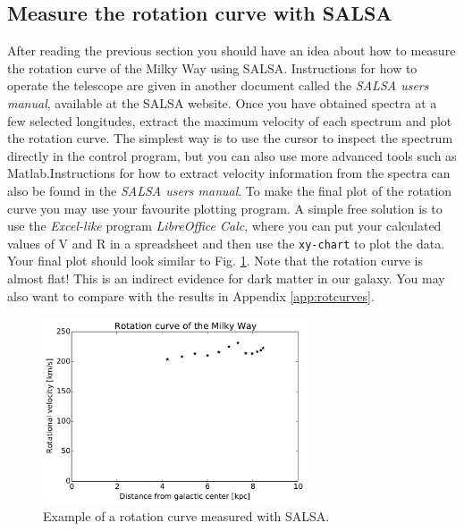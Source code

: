 \subsection{Measure the rotation curve with SALSA}
\label{sect:SALSArot}
After reading the previous section you should have an idea about how to measure
the rotation curve of the Milky Way using SALSA. Instructions for how to
operate the telescope are given in another document called the \emph{SALSA
users manual}, available at the SALSA website.
Once you have obtained spectra
at a few selected longitudes, extract the maximum velocity of each spectrum and
plot the rotation curve.   
The simplest way is to use the cursor to inspect the spectrum directly in the
control program, but you can also use more advanced tools such as
Matlab.Instructions for how to extract velocity information from the spectra
can also be found in the \emph{SALSA users manual}.
To make the final plot of the rotation curve you may use your favourite
plotting program.  A simple free solution is to use the \emph{Excel-like}
program \emph{LibreOffice Calc}, where you can put your calculated
values of V and R in a spreadsheet and then use the {\tt xy-chart} 
to plot the data. Your final plot should look similar to Fig. \ref{fig:rotfinal}.
Note that the rotation curve is almost flat! This is an indirect evidence
for dark matter in our galaxy. You may also want to compare with the results in 
Appendix \ref{app:rotcurves}.

\begin{figure}[t]
\begin{center}
\includegraphics[width=0.7\textwidth]{../figures/SALSA_rotcurve.pdf}
\caption{Example of a rotation curve measured with SALSA.}
\label{fig:rotfinal}
\end{center}
\end{figure}

